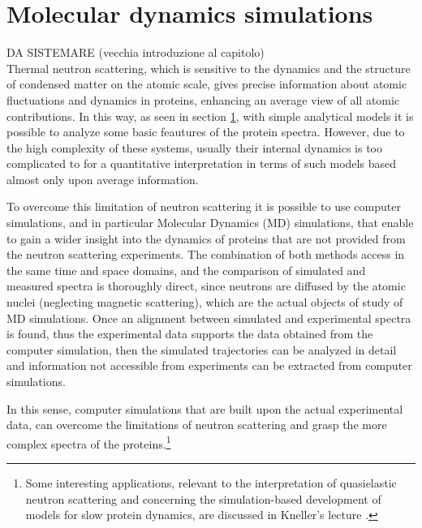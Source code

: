 \chapter{Molecular dynamics simulations}

DA SISTEMARE (vecchia introduzione al capitolo)\\
Thermal neutron scattering, which is sensitive to the dynamics and the structure of condensed matter on the atomic scale, gives precise information about atomic fluctuations and dynamics in proteins, enhancing an average view of all atomic contributions.
In this way, as seen in section \ref{}, with simple analytical models it is possible to analyze some basic feautures of the protein spectra. However, due to the high complexity of these systems, usually their internal dynamics is too complicated to for a quantitative interpretation in terms of such models based almost only upon average information. 

To overcome this limitation of neutron scattering it is possible to use computer simulations, and in particular Molecular Dynamics (MD) simulations, that enable to gain a wider insight into the dynamics of proteins that are not provided from the neutron scattering experiments. The combination of both methods access in the same time and space domains, and the comparison of simulated and measured spectra is thoroughly direct, since neutrons are diffused by the atomic nuclei (neglecting magnetic scattering), which are the actual objects of study of MD simulations. Once an alignment between simulated and experimental spectra is found, thus the experimental data supports the data obtained from the computer simulation, then the simulated trajectories can be analyzed in detail and information not accessible from experiments can be extracted from computer simulations.

In this sense, computer simulations that are built upon the actual experimental data, can overcome the limitations of neutron scattering and grasp the more complex spectra of the proteins.\footnote{Some interesting applications, relevant to the interpretation of quasielastic neutron scattering and concerning the simulation-based development of models for slow protein dynamics, are discussed in Kneller's lecture \cite{ref:QNS_Keller}.}

